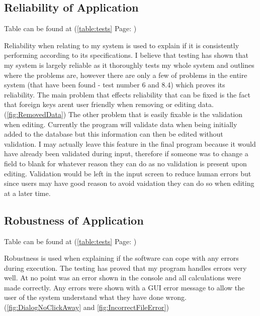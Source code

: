 \subsection{Reliability of Application}

Table can be found at (\ref{table:tests} Page: \pageref{table:tests})

Reliability when relating to my system is used to explain if it is consistently performing according to its specifications. I believe that testing has shown that my system is largely reliable as it thoroughly tests my whole system and outlines where the problems are, however there are only a few of problems in the entire system (that have been found - test number 6 and 8.4) which proves its reliability. The main problem that effects reliability that can be fixed is the fact that foreign keys arent user friendly when removing or editing data. (\ref{fig:RemovedData}) The other problem that is easily fixable is the validation when editing. Currently the program will validate data when being initially added to the database but this information can then be edited without validation. I may actually leave this feature in the final program because it would have already been validated during input, therefore if someone was to change a field to blank for whatever reason they can do as no validation is present upon editing. Validation would be left in the input screen to reduce human errors but since users may have good reason to avoid vaidation they can do so when editing at a later time.

\subsection{Robustness of Application}

Table can be found at (\ref{table:tests} Page: \pageref{table:tests})

Robustness is used when explaining if the software can cope with any errors during execution. The testing has proved that my program handles errors very well. At no point was an error shown in the console and all calculations were made correctly. Any errors were shown with a GUI error message to allow the user of the system understand what they have done wrong.(\ref{fig:DialogNoClickAway} and \ref{fig:IncorrectFileError}) 
